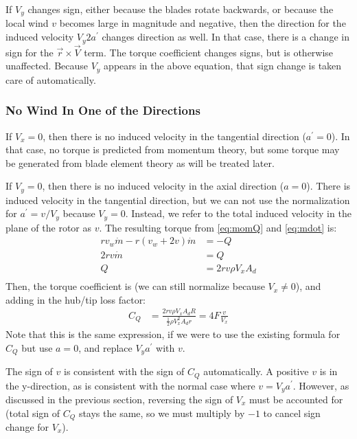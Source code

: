 \documentclass{article}
\begin{document}
If $V_y$ changes sign, either because the blades rotate backwards, or because the local wind $v$ becomes large in magnitude and negative, then the direction for the induced velocity $V_y 2 a^\prime$ changes direction as well.  In that case, there is a change in sign for the $\vec{r} \times \vec{V}$ term.  The torque coefficient changes signs, but is otherwise unaffected.  Because $V_y$ appears in the above equation, that sign change is taken care of automatically.

\subsubsection{No Wind In One of the Directions}

If $V_x = 0$, then there is no induced velocity in the tangential direction ($a^\prime = 0$).  In that case, no torque is predicted from momentum theory, but some torque may be generated from blade element theory as will be treated later.

If $V_y = 0$, then there is no induced velocity in the axial direction ($a = 0$).  There is induced velocity in the tangential direction, but we can not use the normalization for $a^\prime = v/V_y$ because $V_y = 0$.  Instead, we refer to the total induced velocity in the plane of the rotor as $v$.  The resulting torque from \cref{eq:momQ} and \cref{eq:mdot} is:
\begin{equation}
    \begin{aligned}
        r v_w \dot{m} - r (v_w + 2 v) \dot{m} &= -Q\\
        2 r v \dot{m} &= Q\\
        Q &= 2 r v \rho V_x A_d\\
    \end{aligned}
    \label{eq:momQ}
\end{equation}
Then, the torque coefficient is (we can still normalize because $V_x \neq 0$), and adding in the hub/tip loss factor:
\begin{equation}
\begin{aligned}
    C_Q &=  \frac{2 r v \rho V_x A_d R}{\frac{1}{2}\rho V_x^2 A_d r} = 4F \frac{v}{V_x}
\end{aligned}
\end{equation}
Note that this is the same expression, if we were to use the existing formula for $C_Q$ but use $a = 0$, and replace $V_y a^\prime$ with $v$.

The sign of $v$ is consistent with the sign of $C_Q$ automatically.  A positive $v$ is in the y-direction, as is consistent with the normal case where $v = V_y a^\prime$.  However, as discussed in the previous section, reversing the sign of $V_x$ must be accounted for (total sign of $C_Q$ stays the same, so we must multiply by $-1$ to cancel sign change for $V_x$).
\end{document}
